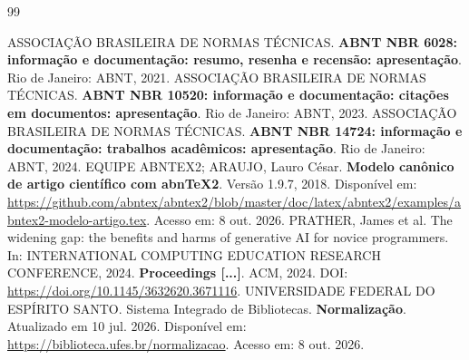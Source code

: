 \clearpage
\begin{singlespace}
\begin{thebibliography}{99}
\raggedright
{} ASSOCIAÇÃO BRASILEIRA DE NORMAS TÉCNICAS. \textbf{ABNT NBR 6028: informação e documentação: resumo, resenha e recensão: apresentação}. Rio de Janeiro: ABNT, 2021.
 ASSOCIAÇÃO BRASILEIRA DE NORMAS TÉCNICAS. \textbf{ABNT NBR 10520: informação e documentação: citações em documentos: apresentação}. Rio de Janeiro: ABNT, 2023.
 ASSOCIAÇÃO BRASILEIRA DE NORMAS TÉCNICAS. \textbf{ABNT NBR 14724: informação e documentação: trabalhos acadêmicos: apresentação}. Rio de Janeiro: ABNT, 2024.
 EQUIPE ABNTEX2; ARAUJO, Lauro César. \textbf{Modelo canônico de artigo científico com abnTeX2}. Versão 1.9.7, 2018. Disponível em: \url{https://github.com/abntex/abntex2/blob/master/doc/latex/abntex2/examples/abntex2-modelo-artigo.tex}. Acesso em: 8 out. 2026.
 PRATHER, James et al. The widening gap: the benefits and harms of generative AI for novice programmers. In: INTERNATIONAL COMPUTING EDUCATION RESEARCH CONFERENCE, 2024. \textbf{Proceedings [...]}. ACM, 2024. DOI: \url{https://doi.org/10.1145/3632620.3671116}.
 UNIVERSIDADE FEDERAL DO ESPÍRITO SANTO. Sistema Integrado de Bibliotecas. \textbf{Normalização}. Atualizado em 10 jul. 2026. Disponível em: \url{https://biblioteca.ufes.br/normalizacao}. Acesso em: 8 out. 2026.
\end{thebibliography}
\end{singlespace}
